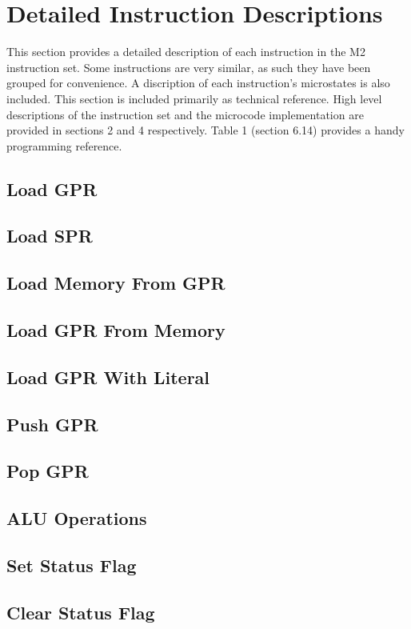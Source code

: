 \documentclass[a4paper,12pt]{article}
\newcommand{\mi}{M2 instruction set}
\begin{document}
\newpage
\section{Detailed Instruction Descriptions}
This section provides a detailed description of each instruction in the \mi{}.
Some instructions are very similar, as such they have been grouped for 
convenience. A discription of each instruction's microstates is also included.
This section is included primarily as technical reference. High level 
descriptions of the instruction set and the microcode implementation are provided
in sections 2 and 4 respectively. Table 1 (section 6.14) provides a handy 
programming reference.
\par
\subsection{Load GPR}
\subsection{Load SPR}
\subsection{Load Memory From GPR}
\subsection{Load GPR From Memory}
\subsection{Load GPR With Literal}
\subsection{Push GPR}
\subsection{Pop GPR}
\subsection{ALU Operations}
\subsection{Set Status Flag}
\subsection{Clear Status Flag}
\end{document}
